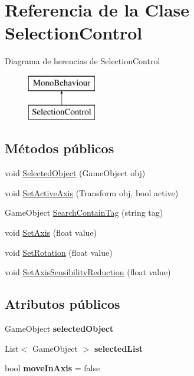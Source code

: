 \hypertarget{class_selection_control}{}\section{Referencia de la Clase Selection\+Control}
\label{class_selection_control}
Diagrama de herencias de Selection\+Control\begin{figure}[H]
\begin{center}
\leavevmode
\includegraphics[height=2.000000cm]{class_selection_control}
\end{center}
\end{figure}
\subsection*{Métodos públicos}
\begin{DoxyCompactItemize}
\item 
void \mbox{\hyperlink{class_selection_control_a3da021bd2d11255eadadc832b40e6fb6}{Selected\+Object}} (Game\+Object obj)
\item 
void \mbox{\hyperlink{class_selection_control_af45a0f8f9cf7f200e423971f190d8bbf}{Set\+Active\+Axis}} (Transform obj, bool active)
\item 
Game\+Object \mbox{\hyperlink{class_selection_control_a8e92014a9781e84be7079f4dfd96caf9}{Search\+Contain\+Tag}} (string tag)
\item 
void \mbox{\hyperlink{class_selection_control_a5d456be16e3132ae65d37f866ee009f3}{Set\+Axis}} (float value)
\item 
void \mbox{\hyperlink{class_selection_control_ae30e28c63db233cb7a7b9d71174c2846}{Set\+Rotation}} (float value)
\item 
void \mbox{\hyperlink{class_selection_control_ab62778748bb69e20a9fd3318a3083853}{Set\+Axis\+Sensibility\+Reduction}} (float value)
\end{DoxyCompactItemize}
\subsection*{Atributos públicos}
\begin{DoxyCompactItemize}
\item 
\mbox{\label{class_selection_control_ad7c2fe8ddd7a667218189d834d875437}} 
Game\+Object {\bfseries selected\+Object}
\item 
\mbox{\label{class_selection_control_a91300a4e40f06901799b7b582f53b398}} 
List$<$ Game\+Object $>$ {\bfseries selected\+List}
\item 
\mbox{\label{class_selection_control_a30385310a008d84dd95762f72dd31fed}} 
bool {\bfseries move\+In\+Axis} = false
\end{DoxyCompactItemize}
